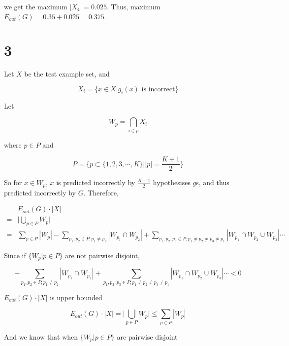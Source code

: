 \documentclass[fleqn,a4paper,12pt]{article}
\begin{document}
we get the maximum $|X_4| = 0.025$. Thus, maximum $E_{out}(G) = 0.35 + 0.025 = 0.375$.

\section*{3}

Let $X$ be the test example set, and

\begin{equation*}
  X_i = \{x \in X | \text{$g_i(x)$ is incorrect} \}
\end{equation*}

Let

\begin{equation*}
  W_p = \bigcap_{i \in p} X_i
\end{equation*}

where $p \in P$ and

\begin{equation*}
  P = \{ p \subset \{1, 2, 3, \cdots, K\} | |p| = \frac{K + 1}{2} \}
\end{equation*}

So for $x \in W_p$, $x$ is predicted incorrectly by $\frac{K + 1}{2}$ hypothesises $g$s, and thus predicted incorrectly by $G$. Therefore,

\begin{align*}
  &E_{out}(G) \cdot |X| \\
  =& \lvert \bigcup_{p \in P} W_p \rvert \\
  =& \sum_{p \in P} |W_p| - \sum_{p_1, p_2 \in P; p_1 \ne p_2} |W_{p_1} \cap W_{p_2}| + \sum_{p_1, p_2, p_3 \in P; p_1 \ne p_2 \ne p_3 \ne p_1} |W_{p_1} \cap W_{p_2} \cup W_{p_3}| \cdots
\end{align*}

Since if $\{ W_p | p \in P\}$ are not pairwise disjoint,

\begin{equation*}
- \sum_{p_1, p_2 \in P; p_1 \ne p_2} |W_{p_1} \cap W_{p_2}| + \sum_{p_1, p_2, p_3 \in P; p_1 \ne p_2 \ne p_3 \ne p_1} |W_{p_1} \cap W_{p_2} \cup W_{p_3}| \cdots < 0
\end{equation*}

$E_{out}(G) \cdot |X|$ is upper bounded

\begin{equation*}
  E_{out}(G) \cdot |X| = \lvert \bigcup_{p \in P} W_p \rvert \leq \sum_{p \in P} |W_p| 
\end{equation*}

And we know that when $\{ W_p | p \in P\}$ are pairwise disjoint
\end{document}
